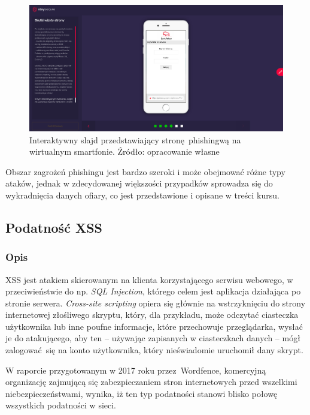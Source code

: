 \documentclass[12pt,twoside]{article}
\begin{document}
\begin{figure}[H]
	\centering
	\includegraphics[width=1\linewidth]{figures/phishing-slide-screenshot2.png}
	\caption{Interaktywny slajd przedstawiający stronę phishingwą na wirtualnym smartfonie. Źródło: opracowanie własne}
	\label{fig:phishing-organisations}
\end{figure}

Obszar zagrożeń phishingu jest bardzo szeroki i może obejmować różne typy ataków, jednak w zdecydowanej większości przypadków sprowadza się do wykradnięcia danych ofiary, co jest przedstawione i opisane w treści kursu.

\clearpage

\subsection{Podatność XSS}
\subsubsection{Opis}

XSS jest atakiem skierowanym na klienta korzystającego serwisu webowego, w przeciwieństwie do np. \emph{SQL Injection}, którego celem jest aplikacja działająca po stronie serwera. \emph{Cross-site scripting} opiera się głównie na wstrzyknięciu do strony internetowej złośliwego skryptu, który, dla przykładu, może odczytać ciasteczka użytkownika lub inne poufne informacje, które przechowuje przeglądarka, wysłać je do atakującego, aby ten -- używając zapisanych w ciasteczkach danych -- mógł zalogować się na konto użytkownika, który nieświadomie uruchomił dany skrypt. %

W raporcie przygotowanym w 2017 roku przez Wordfence, komercyjną organizację zajmującą się zabezpieczaniem stron internetowych przed wszelkimi niebezpieczeństwami, wynika, iż ten typ podatności stanowi blisko połowę wszystkich podatności w sieci.
\end{document}
